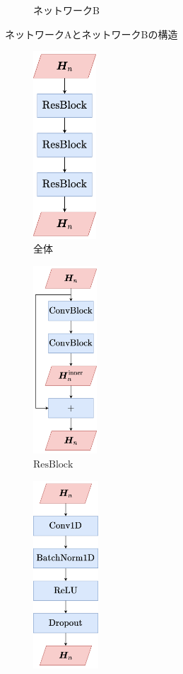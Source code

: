 \begin{figure}[tb]
\begin{subfigure}[b]{0.48\textwidth}
        \caption{ネットワークB}
        \label{sec4:fig:networkB}
    \end{subfigure}
    \hfill
    \caption{ネットワークAとネットワークBの構造}
    \label{sec4:fig:networkAB}
\end{figure}

\begin{figure}[tb]
    \centering
    \begin{subfigure}[b]{0.32\textwidth}
        \centering
        \includegraphics[height=70mm]{./figure/sec4/model_2/post.drawio.png}
        \caption{全体}
        \label{sec4:fig:post}
    \end{subfigure}
    \hfill
    \begin{subfigure}[b]{0.32\textwidth}
        \centering
        \includegraphics[height=70mm]{./figure/sec4/model_2/post_resblock.drawio.png}
        \caption{$\text{ResBlock}$}
        \label{sec4:fig:post_resblock}
    \end{subfigure}
    \hfill
    \begin{subfigure}[b]{0.32\textwidth}
        \centering
        \includegraphics[height=70mm]{./figure/sec4/model_2/post_convblock.drawio.png}

\end{subfigure}
\end{figure}
